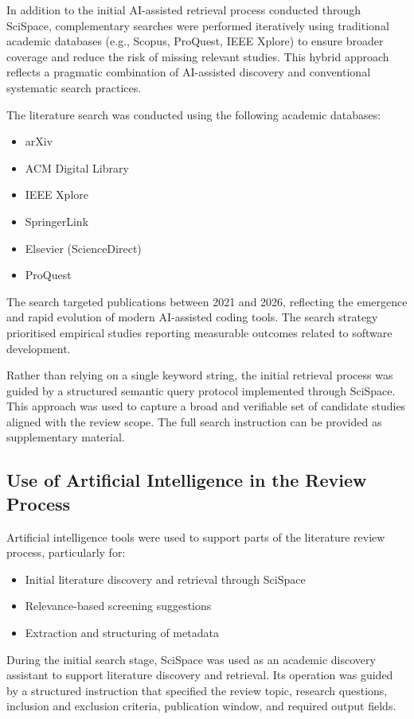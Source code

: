 \documentclass[conference]{IEEEtran}
\begin{document}
In addition to the initial AI-assisted retrieval process conducted through SciSpace, complementary searches were performed iteratively using traditional academic databases (e.g., Scopus, ProQuest, IEEE Xplore) to ensure broader coverage and reduce the risk of missing relevant studies. This hybrid approach reflects a pragmatic combination of AI-assisted discovery and conventional systematic search practices.

The literature search was conducted using the following academic databases:
\begin{itemize}
    \item arXiv
    \item ACM Digital Library
    \item IEEE Xplore
    \item SpringerLink
    \item Elsevier (ScienceDirect)
    \item ProQuest
\end{itemize}

The search targeted publications between 2021 and 2026, reflecting the emergence and rapid evolution of modern AI-assisted coding tools. The search strategy prioritised empirical studies reporting measurable outcomes related to software development.

Rather than relying on a single keyword string, the initial retrieval process was guided by a structured semantic query protocol implemented through SciSpace. This approach was used to capture a broad and verifiable set of candidate studies aligned with the review scope. The full search instruction can be provided as supplementary material.

\subsection{Use of Artificial Intelligence in the Review Process}

Artificial intelligence tools were used to support parts of the literature review process, particularly for:
\begin{itemize}
    \item Initial literature discovery and retrieval through SciSpace
    \item Relevance-based screening suggestions
    \item Extraction and structuring of metadata
\end{itemize}

During the initial search stage, SciSpace was used as an academic discovery assistant to support literature discovery and retrieval. Its operation was guided by a structured instruction that specified the review topic, research questions, inclusion and exclusion criteria, publication window, and required output fields.
\end{document}
